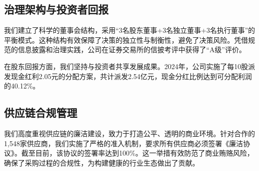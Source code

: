 \documentclass[a4paper,12pt]{article}
\begin{document}
\subsection{治理架构与投资者回报}

我们建立了科学的董事会结构，采用“3名股东董事+3名独立董事+3名执行董事”的平衡模式。这种结构有效保障了决策的独立性与制衡性，避免了决策风险。凭借规范的信息披露和治理实践，公司在证券交易所的信披考评中获得了“A级”评价。

在股东回报方面，我们坚持与投资者共享发展成果。2024年，公司实施了每10股派发现金红利2.05元的分配方案，共计派发2.54亿元，现金分红比例达到可分配利润的40.12\%。

\subsection{供应链合规管理}

我们高度重视供应链的廉洁建设，致力于打造公平、透明的商业环境。针对合作的1,548家供应商，我们实施了严格的准入机制，要求所有供应商必须签署《廉洁协议》。截至目前，该协议的签署率达到100\%。这一举措有效防范了商业贿赂风险，确保了采购过程的合规性，为构建健康的行业生态做出了贡献。
\end{document}
